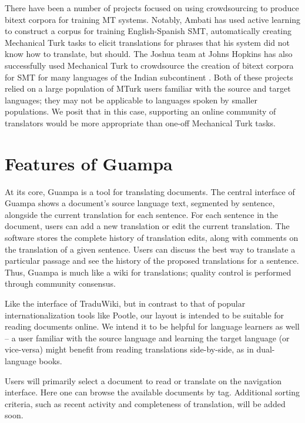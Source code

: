 \documentclass[10pt, a4paper]{article}
\begin{document}
There have been a number of projects focused on using crowdsourcing to produce
bitext corpora for training MT systems. Notably, Ambati
\cite{ambati_naacl,ambati_act} has used active learning to construct a corpus
for training English-Spanish SMT, automatically creating Mechanical Turk tasks
to elicit translations for phrases that his system did not know how to
translate, but should. The Joshua team at Johns Hopkins has also successfully
used Mechanical Turk to crowdsource the creation of bitext corpora for SMT for
many languages of the Indian subcontinent
\cite{post-callisonburch-osborne:2012:WMT}. Both of these projects relied on a
large population of MTurk users familiar with the source and target languages;
they may not be applicable to languages spoken by smaller populations. We posit
that in this case, supporting an online community of translators would be more
appropriate than one-off Mechanical Turk tasks.

\section{Features of Guampa}
At its core, Guampa is a tool for translating documents. The central interface of
Guampa shows a document's source language text, segmented by sentence,
alongside the current translation for each sentence. For each sentence in the
document, users can add a new translation or edit the current translation. The
software stores the complete history of translation edits, along with comments
on the translation of a given sentence. Users can discuss the
best way to translate a particular passage and see the history of the proposed
translations for a sentence. Thus, Guampa is much like a wiki for translations;
quality control is performed through community consensus.


Like the interface of TraduWiki, but in contrast to that of popular
internationalization tools like Pootle, our layout is intended to be suitable
for reading documents online. We intend it to be helpful for language learners
as well -- a user familiar with the source language and learning the target
language (or vice-versa) might benefit from reading translations side-by-side,
as in dual-language books.

Users will primarily select a document to read or translate on the navigation
interface. Here one can browse the available documents by tag. Additional
sorting criteria, such as recent activity and completeness of translation, will
be added soon.
\end{document}
